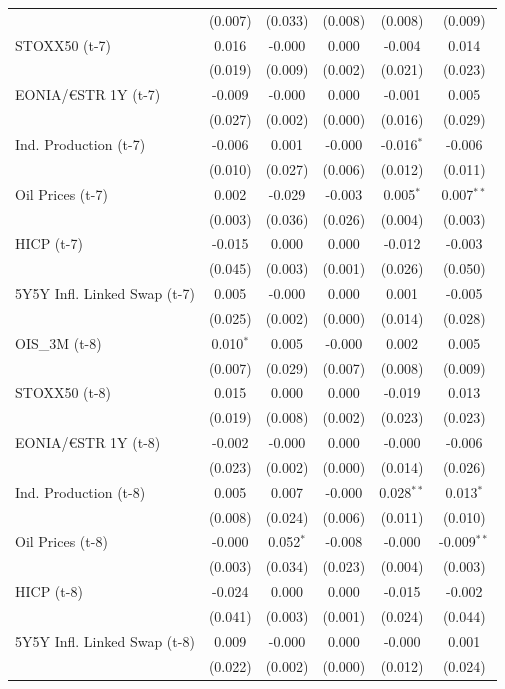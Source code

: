 \begin{longtable}[t]{lccccc}
 & (0.007) & (0.033) & (0.008) & (0.008) & (0.009)\\
STOXX50 (t-7) & 0.016 & -0.000 & 0.000 & -0.004 & 0.014\\
 & (0.019) & (0.009) & (0.002) & (0.021) & (0.023)\\
EONIA/€STR 1Y (t-7) & -0.009 & -0.000 & 0.000 & -0.001 & 0.005\\
 & (0.027) & (0.002) & (0.000) & (0.016) & (0.029)\\
Ind. Production (t-7) & -0.006 & 0.001 & -0.000 & -0.016$^{*}$ & -0.006\\
 & (0.010) & (0.027) & (0.006) & (0.012) & (0.011)\\
Oil Prices (t-7) & 0.002 & -0.029 & -0.003 & 0.005$^{*}$ & 0.007$^{**}$\\
 & (0.003) & (0.036) & (0.026) & (0.004) & (0.003)\\
HICP (t-7) & -0.015 & 0.000 & 0.000 & -0.012 & -0.003\\
 & (0.045) & (0.003) & (0.001) & (0.026) & (0.050)\\
5Y5Y Infl. Linked Swap (t-7) & 0.005 & -0.000 & 0.000 & 0.001 & -0.005\\
 & (0.025) & (0.002) & (0.000) & (0.014) & (0.028)\\
OIS\_3M (t-8) & 0.010$^{*}$ & 0.005 & -0.000 & 0.002 & 0.005\\
 & (0.007) & (0.029) & (0.007) & (0.008) & (0.009)\\
STOXX50 (t-8) & 0.015 & 0.000 & 0.000 & -0.019 & 0.013\\
 & (0.019) & (0.008) & (0.002) & (0.023) & (0.023)\\
EONIA/€STR 1Y (t-8) & -0.002 & -0.000 & 0.000 & -0.000 & -0.006\\
 & (0.023) & (0.002) & (0.000) & (0.014) & (0.026)\\
Ind. Production (t-8) & 0.005 & 0.007 & -0.000 & 0.028$^{**}$ & 0.013$^{*}$\\
 & (0.008) & (0.024) & (0.006) & (0.011) & (0.010)\\
Oil Prices (t-8) & -0.000 & 0.052$^{*}$ & -0.008 & -0.000 & -0.009$^{**}$\\
 & (0.003) & (0.034) & (0.023) & (0.004) & (0.003)\\
HICP (t-8) & -0.024 & 0.000 & 0.000 & -0.015 & -0.002\\
 & (0.041) & (0.003) & (0.001) & (0.024) & (0.044)\\
5Y5Y Infl. Linked Swap (t-8) & 0.009 & -0.000 & 0.000 & -0.000 & 0.001\\
 & (0.022) & (0.002) & (0.000) & (0.012) & (0.024)\\

\end{longtable}
